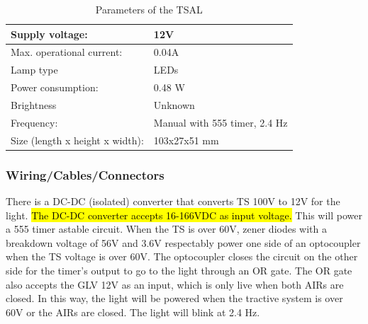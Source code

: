 \documentclass{article}
\DeclareRobustCommand{\hlr}[1]{{\sethlcolor{red}\hl{#1}}}
\begin{document}
            \begin{table}[H]
                \centering
                \begin{tabular}{|l|l|}
                \hline
                Supply voltage: & 12V \\ \hline
                Max. operational current: &  0.04A\\ \hline
                Lamp type & LEDs \\ \hline
                Power consumption: & 0.48 W\\ \hline
                Brightness & Unknown \\ \hline
                Frequency: & Manual with 555 timer, 2.4 Hz \\ \hline
                Size (length x height x width): & 103x27x51 mm \\ \hline
                \end{tabular}
                \caption{Parameters of the TSAL}
                \label{TSALparameters}
            \end{table}

        \subsubsection{Wiring/Cables/Connectors}


            There is a DC-DC (isolated) converter that converts TS 100V to 12V for the light. \hlr{The DC-DC converter accepts 16-166VDC as input voltage.} This will power a 555 timer astable circuit. When the TS is over 60V, zener diodes with a breakdown voltage of 56V and 3.6V respectably power one side of an optocoupler when the TS voltage is over 60V. The optocoupler closes the circuit on the other side for the timer's output to go to the light through an OR gate. The OR gate also accepts the GLV 12V as an input, which is only live when both AIRs are closed. In this way, the light will be powered when the tractive system is over 60V or the AIRs are closed. The light will blink at 2.4 Hz.
\end{document}
